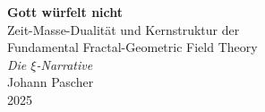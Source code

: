 \documentclass[11pt,oneside]{book}
\begin{document}
\pagestyle{fancy}
\makeatletter
\let\ps@plain\ps@fancy
\let\ps@empty\ps@fancy
\makeatother

\begin{titlepage}
	\centering
	\vspace*{2cm}
	
	{\Huge\bfseries Gott würfelt nicht}\\[0.8cm]
	{\LARGE Zeit-Masse-Dualität und Kernstruktur der}\\[0.3cm]
	{\LARGE Fundamental Fractal-Geometric Field Theory}\\[1.5cm]
	
	{\Large\itshape Die $\xi$-Narrative}\\[2cm]
	
	{\large Johann Pascher}\\[1cm]
	
	{\large 2025}
	
	\vfill
\end{titlepage}

\frontmatter
\pagestyle{fancy}
\tableofcontents

\mainmatter
\pagestyle{fancy}




\end{document}
